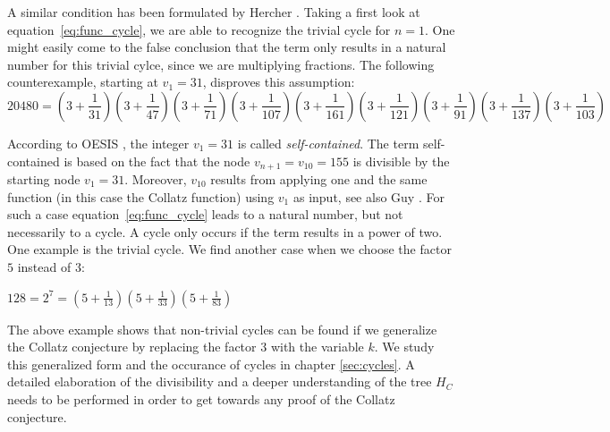 A similar condition has been formulated by Hercher \cite{Ref_Hercher}. Taking a first look at equation~\ref{eq:func_cycle}, we are able to recognize the trivial cycle for $n=1$. One might easily come to the false conclusion that the term only results in a natural number for this trivial cylce, since we are multiplying fractions. The following counterexample, starting at $v_1=31$, disproves this assumption:
\begin{equation*}
20480=\left(3+\frac{1}{31}\right)\left(3+\frac{1}{47}\right)
\left(3+\frac{1}{71}\right)\left(3+\frac{1}{107}\right)\left(3+\frac{1}{161}\right)\left(3+\frac{1}{121}\right)\left(3+\frac{1}{91}\right)\left(3+\frac{1}{137}\right)\left(3+\frac{1}{103}\right)
\end{equation*}

According to OESIS \cite{Ref_OESIS}, the integer $v_1=31$ is called \textit{self-contained}. The term self-contained is based on the fact that the node $v_{n+1}=v_{10}=155$ is divisible by the starting node $v_1=31$. Moreover, $v_{10}$ results from applying one and the same function (in this case the Collatz function) using $v_1$ as input, see also Guy \cite[p.~332]{Ref_Guy}. For such a case equation~\ref{eq:func_cycle} leads to a natural number, but not necessarily to a cycle. A cycle only occurs if the term results in a power of two. One example is the trivial cycle. We find another case when we choose the factor $5$ instead of $3$:
\begin{center}
	$128=2^7=\left(5+\frac{1}{13}\right)\left(5+\frac{1}{33}\right)
	\left(5+\frac{1}{83}\right)$
\end{center}

The above example shows that non-trivial cycles can be found if we generalize the Collatz conjecture by replacing the factor $3$ with the variable $k$. We study this generalized form and the occurance of cycles in chapter \ref{sec:cycles}. A detailed elaboration of the divisibility and a deeper understanding of the tree $H_C$ needs to be performed in order to get towards any proof of the Collatz conjecture.


